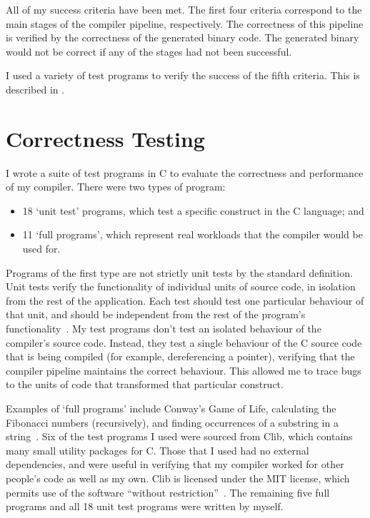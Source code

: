 \documentclass[00-main.tex]{subfiles}
\begin{document}
All of my success criteria have been met.
The first four criteria correspond to the main stages of the compiler pipeline, respectively.
The correctness of this pipeline is verified by the correctness of the generated binary code.
The generated binary would not be correct if any of the stages had not been successful.

I used a variety of test programs to verify the success of the fifth criteria. This is described in .


\section{Correctness Testing}\label{sec:eval:correctness testing}

I wrote a suite of test programs in C to evaluate the correctness and performance of my compiler.
There were two types of program:
\begin{itemize}
\item 18 `unit test' programs, which test a specific construct in the C language; and
\item 11 `full programs', which represent real workloads that the compiler would be used for.
\end{itemize}

Programs of the first type are not strictly unit tests by the standard definition.
Unit tests verify the functionality of individual units of source code, in isolation from the rest of the application.
Each test should test one particular behaviour of that unit, and should be independent from the rest of the program's functionality~.
My test programs don't test an isolated behaviour of the compiler's source code.
Instead, they test a single behaviour of the C source code that is being compiled (for example, dereferencing a pointer), verifying that the compiler pipeline maintains the correct behaviour.
This allowed me to trace bugs to the units of code that transformed that particular construct.

Examples of `full programs' include Conway's Game of Life, calculating the Fibonacci numbers (recursively), and finding occurrences of a substring in a string~.
Six of the test programs I used were sourced from Clib, which contains many small utility packages for C. Those that I used had no external dependencies, and were useful in verifying that my compiler worked for other people's code as well as my own. Clib is licensed under the MIT license, which permits use of the software ``without restriction''~.
The remaining five full programs and all 18 unit test programs were written by myself.
\end{document}
